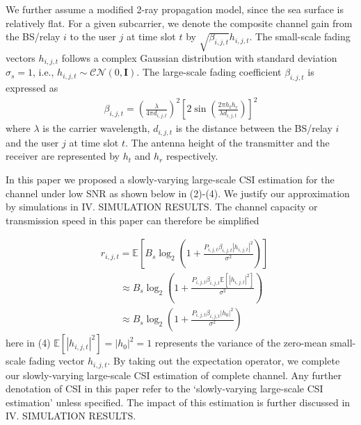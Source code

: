 \documentclass{ieeeaccess}
\begin{document}
We further assume a modified 2-ray propagation model, since the sea surface is relatively flat. For a given subcarrier, we denote the composite channel gain from the BS/relay $i$ to the user $j$ at time slot $t$ by $\sqrt {{\beta _{i,j,t}}} {h_{i,j,t}}$. The small-scale fading vectors ${h_{i,j,t}}$ follows a complex Gaussian distribution with standard deviation ${\sigma _s} = 1$, i.e., ${h_{i,j,t}} \sim \mathcal{CN}(0, \mathbf{I})$. The large-scale fading coefficient ${\beta _{i,j,t}}$ is expressed as
\begin{align}
{\beta _{i,j,t}} = {\left( {\frac{\lambda }{{4\pi {d_{i,j,t}}}}} \right)^2}{\left[ {2\sin \left( {\frac{{2\pi {h_t}{h_r}}}{{\lambda {d_{i,j,t}}}}} \right)} \right]^2}
\end{align}
where $\lambda $ is the carrier wavelength, ${d_{i,j,t}}$ is the distance between the BS/relay $i$ and the user $j$ at time slot $t$. The antenna height of the transmitter and the receiver are represented by $h_t$ and $h_r$ respectively.

In this paper we proposed a slowly-varying large-scale CSI estimation for the channel under low SNR as shown below in (2)-(4). We justify our approximation by simulations in IV. SIMULATION RESULTS. The channel capacity or transmission speed in this paper can therefore be simplified

\begin{align}
& {r_{i,j,t}} = {\mathbb{E}}\left [ {{B_s}{{\log }_2}\left( {1 + \frac{{{P_{i,j,t}}{\beta _{i,j,t}}{{\left| {{h_{i,j,t}}} \right|}^2}}}{{{\sigma ^2}}}} \right)} \right ] \\
& \;\;\;\;\;\;\; \approx {B_s}{\log _2}\left( {1 + \frac{{{P_{i,j,t}}{\beta _{i,j,t}}{\mathbb{E}}\left [ {{{\left| {{h_{i,j,t}}} \right|}^2}} \right ]}}{{{\sigma ^2}}}} \right)\\
& \;\;\;\;\;\;\; \approx {B_s}{\log _2}\left( {1 + \frac{{{P_{i,j,t}}{\beta _{i,j,t}}{{\left| {{h_0}} \right|}^2}}}{{{\sigma ^2}}}} \right)
\end{align}
here in (4) ${{\mathbb{E}}\left [ {{{\left| {{h_{i,j,t}}} \right|}^2}} \right ] = \left| {{h_0}} \right|^2} = 1$ represents the variance of the zero-mean small-scale fading vector ${h_{i,j,t}}$. By taking out the expectation operator, we complete our slowly-varying large-scale CSI estimation of complete channel. Any further denotation of CSI in this paper refer to the `slowly-varying large-scale CSI estimation' unless specified. The impact of this estimation is further discussed in IV. SIMULATION RESULTS.
\end{document}

